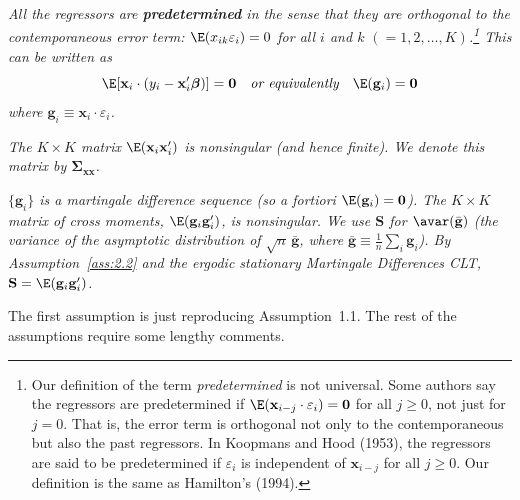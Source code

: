 \begin{assumption}
\label{ass:2.3}
\emph{All the regressors are \textbf{predetermined} in the sense that they are
orthogonal to the contemporaneous error term:
$\E(x_{ik}\varepsilon_i) = 0$ for all $i$ and $k$ $(= 1, 2, \ldots, K)$.\footnote{Our
definition of the term \emph{predetermined} is not universal.  Some authors say the
regressors are predetermined if
$\E(\mathbf{x}_{i-j} \cdot \varepsilon_i) = \mathbf{0}$ for all $j \geq 0$, not just
for $j = 0$.  That is, the error term is orthogonal not only to the contemporaneous
but also the past regressors.  In Koopmans and Hood (1953), the regressors are said
to be predetermined if $\varepsilon_i$ is independent of $\mathbf{x}_{i-j}$ for all
$j \geq 0$.  Our definition is the same as Hamilton's (1994).}
This can be written as}
\[
  \E[\mathbf{x}_i \cdot (y_i - \mathbf{x}_i'\bm{\beta})] = \mathbf{0}
  \quad \textit{or equivalently} \quad
  \E(\mathbf{g}_i) = \mathbf{0}
\]
\emph{where $\mathbf{g}_i \equiv \mathbf{x}_i \cdot \varepsilon_i$.}
\end{assumption}

\begin{assumption}
\label{ass:2.4}
\emph{The $K \times K$ matrix $\E(\mathbf{x}_i\mathbf{x}_i')$ is nonsingular (and
hence finite).  We denote this matrix by $\bm{\Sigma}_{\mathbf{xx}}$.}
\end{assumption}

\begin{assumption}
\label{ass:2.5}
\emph{$\{\mathbf{g}_i\}$ is a martingale difference sequence (so a fortiori
$\E(\mathbf{g}_i) = \mathbf{0}$).  The $K \times K$ matrix of cross moments,
$\E(\mathbf{g}_i\mathbf{g}_i')$, is nonsingular.  We use $\mathbf{S}$ for
$\avar(\bar{\mathbf{g}})$ (the variance of the asymptotic distribution of
$\sqrt{n}\,\bar{\mathbf{g}}$, where
$\bar{\mathbf{g}} \equiv \frac{1}{n}\sum_i \mathbf{g}_i$).  By Assumption~\ref{ass:2.2}
and the ergodic stationary Martingale Differences CLT,
$\mathbf{S} = \E(\mathbf{g}_i\mathbf{g}_i')$.}
\end{assumption}

The first assumption is just reproducing Assumption~1.1.  The rest of the assumptions
require some lengthy comments.

